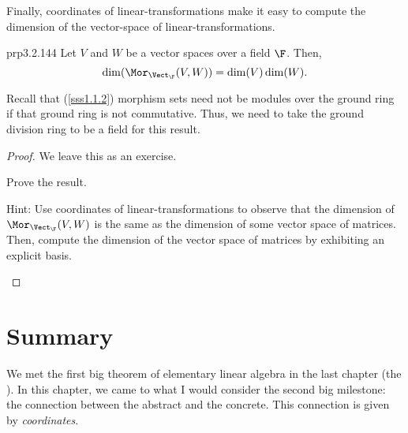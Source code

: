 Finally, coordinates of linear-transformations make it easy to compute the dimension of the vector-space of linear-transformations.
\begin{prp}{}{prp3.2.144}
	Let $V$ and $W$ be a vector spaces over a field $\F$.  Then,
	\begin{equation}
		\dim (\Mor _{\Vect _{\F}}(V,W))=\dim (V)\dim (W).
	\end{equation}
	\begin{rmk}
		Recall that (\cref{sss1.1.2}) morphism sets need not be modules over the ground ring if that ground ring is not commutative.  Thus, we need to take the ground division ring to be a field for this result.
	\end{rmk}
	\begin{proof}
		We leave this as an exercise.
		\begin{exr}[breakable=false]{}{}
			Prove the result.
			\begin{rmk}
				Hint:  Use coordinates of linear-transformations to observe that the dimension of $\Mor _{\Vect _{\F}}(V,W)$ is the same as the dimension of some vector space of matrices.  Then, compute the dimension of the vector space of matrices by exhibiting an explicit basis.
			\end{rmk}
		\end{exr}
	\end{proof}
\end{prp}

\section{Summary}

We met the first big theorem of elementary linear algebra in the last chapter (the ).  In this chapter, we came to what I would consider the second big milestone:  the connection between the abstract and the concrete.  This connection is given by \emph{coordinates}.

